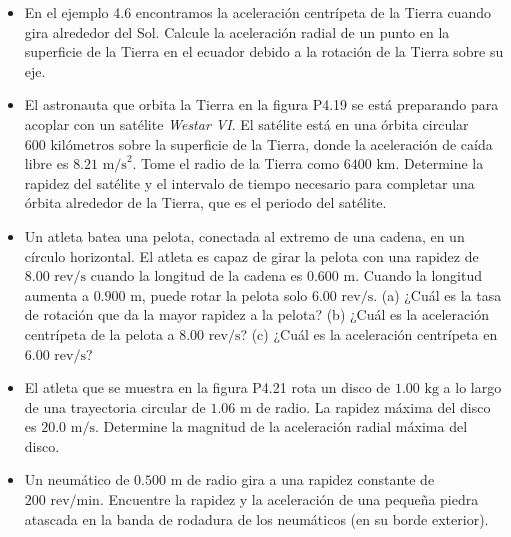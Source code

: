 \documentclass[11pt,a4paper]{article}
\begin{document}
\begin{itemize}
    \item[\textbf{18.}] En el ejemplo 4.6 encontramos la aceleración centrípeta de la Tierra cuando gira alrededor del Sol. Calcule la aceleración radial de un punto en la superficie de la Tierra en el ecuador debido a la rotación de la Tierra sobre su eje.
    \vspace*{6cm}

    \item[\textbf{19.}] El astronauta que orbita la Tierra en la figura P4.19 se está preparando para acoplar con un satélite \textit{Westar VI}. El satélite está en una órbita circular $600 \text{ kilómetros}$ sobre la superficie de la Tierra, donde la aceleración de caída libre es $8.21 \text{ m/s}^2$. Tome el radio de la Tierra como $6400 \text{ km}$. Determine la rapidez del satélite y el intervalo de tiempo necesario para completar una órbita alrededor de la Tierra, que es el periodo del satélite.
    \vspace*{6cm}

    \item[\textbf{20.}] Un atleta batea una pelota, conectada al extremo de una cadena, en un círculo horizontal. El atleta es capaz de girar la pelota con una rapidez de $8.00 \text{ rev/s}$ cuando la longitud de la cadena es $0.600 \text{ m}$. Cuando la longitud aumenta a $0.900 \text{ m}$, puede rotar la pelota solo $6.00 \text{ rev/s}$. (a) ¿Cuál es la tasa de rotación que da la mayor rapidez a la pelota? (b) ¿Cuál es la aceleración centrípeta de la pelota a $8.00 \text{ rev/s}$? (c) ¿Cuál es la aceleración centrípeta en $6.00 \text{ rev/s}$?
    \vspace*{6cm}

    \item[\textbf{21.}] El atleta que se muestra en la figura P4.21 rota un disco de $1.00 \text{ kg}$ a lo largo de una trayectoria circular de $1.06 \text{ m}$ de radio. La rapidez máxima del disco es $20.0 \text{ m/s}$. Determine la magnitud de la aceleración radial máxima del disco.
    \vspace*{6cm}

    \item[\textbf{22.}] Un neumático de $0.500 \text{ m}$ de radio gira a una rapidez constante de $200 \text{ rev/min}$. Encuentre la rapidez y la aceleración de una pequeña piedra atascada en la banda de rodadura de los neumáticos (en su borde exterior).
    \vspace*{6cm}
\end{itemize}
\end{document}
